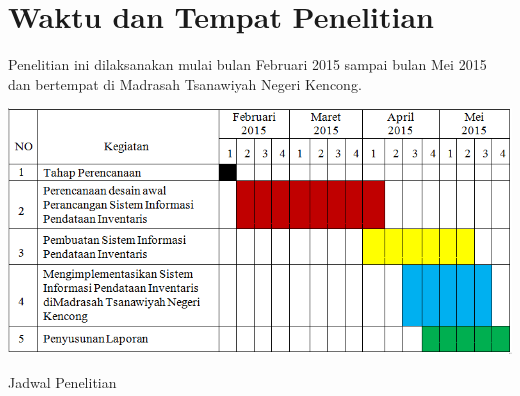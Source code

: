 \documentclass{jtetiproposalskripsi}
\begin{document}
\section{Waktu dan Tempat Penelitian}
Penelitian ini dilaksanakan mulai bulan Februari 2015 sampai bulan Mei 2015 dan bertempat di Madrasah Tsanawiyah Negeri Kencong.
\begin{table}[ht!]
  \centering
    \includegraphics[width=1\textwidth]{gambar/jadwal}
    \caption{Jadwal Penelitian}
    \label{wsn}
\end{table}
\end{document}
